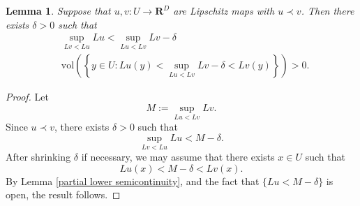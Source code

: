 \documentclass[reqno,11pt]{amsart}
\newcommand{\RR}{\mathbf{R}}
\newcommand{\vol}{\mathrm{vol}}
\newtheorem{lemma}[theorem]{Lemma}
\theoremstyle{definition}
\numberwithin{equation}{section}
\begin{document}
\begin{lemma}\label{separation on a set of positive measure}
Suppose that $u, v: U \to \RR^D$ are Lipschitz maps with $u \prec v$.
Then there exists $\delta > 0$ such that
\begin{align}
&\sup_{Lv < Lu} Lu < \sup_{Lu < Lv} Lv - \delta \\
&\vol\left(\left\{y \in U: Lu(y) < \sup_{Lu < Lv} Lv - \delta < Lv(y)\right\}\right) > 0.
\end{align}
\end{lemma}
\begin{proof}
Let
$$M := \sup_{Lu < Lv} Lv.$$
Since $u \prec v$, there exists $\delta > 0$ such that
$$\sup_{Lv < Lu} Lu < M - \delta.$$
After shrinking $\delta$ if necessary, we may assume that there exists $x \in U$ such that
$$Lu(x) < M - \delta < Lv(x).$$
By Lemma \ref{partial lower semicontinuity}, and the fact that $\{Lu < M - \delta\}$ is open, the result follows.
\end{proof}
\end{document}
